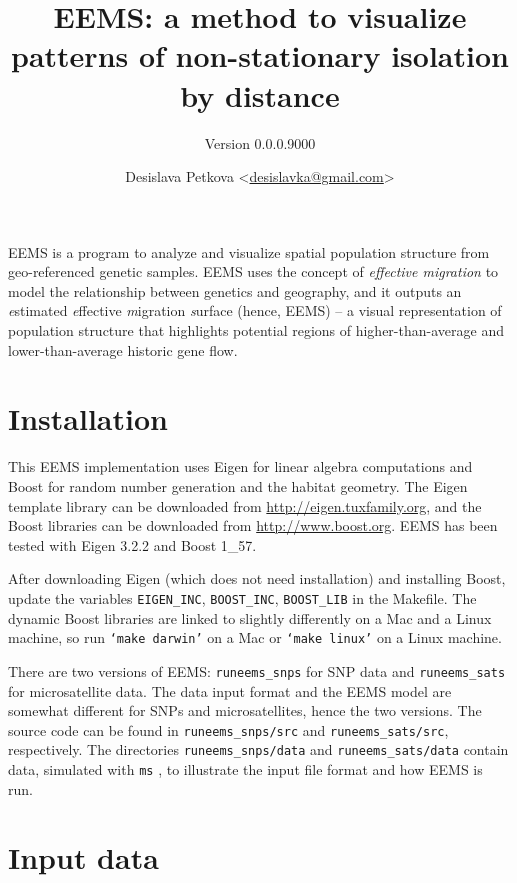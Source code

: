 \documentclass[a4paper,10pt,DIV=15,titlepage,mpinclude=true]{scrartcl}
\title{EEMS: a method to visualize patterns of non-stationary isolation by distance}
\subtitle{Version 0.0.0.9000}
\author{Desislava Petkova <\href{mailto:desislavka@gmail.com}{desislavka@gmail.com}>}
\newcommand{\keystring}[1]{{\tt #1}}
\begin{document}
\maketitle
\tableofcontents
\listoffigures
\clearpage


EEMS is a program to analyze and visualize spatial population structure from geo-referenced genetic samples. EEMS uses the concept of \textit{effective migration} to model the relationship between genetics and geography, and it outputs an \textit{e}stimated \textit{e}ffective \textit{m}igration \textit{s}urface (hence, EEMS) -- a visual representation of population structure that highlights potential regions of higher-than-average and lower-than-average historic gene flow.

\section{Installation}

This EEMS implementation uses Eigen for linear algebra computations and Boost for random number generation and the habitat geometry. The Eigen template library can be downloaded from \url{http://eigen.tuxfamily.org}, and the Boost libraries can be downloaded from \url{http://www.boost.org}. EEMS has been tested with Eigen 3.2.2 and Boost 1\_57.

After downloading Eigen (which does not need installation) and installing Boost, update the variables {\tt EIGEN\_INC}, {\tt BOOST\_INC}, {\tt BOOST\_LIB} in the Makefile. The dynamic Boost libraries are linked to slightly differently on a Mac and a Linux machine, so run \keystring{`make darwin'} on a Mac or \keystring{`make linux'} on a Linux machine.

There are two versions of EEMS: \keystring{runeems\_snps} for SNP data and \keystring{runeems\_sats} for microsatellite data. The data input format and the EEMS model are somewhat different for SNPs and microsatellites, hence the two versions. The source code can be found in \keystring{runeems\_snps/src} and \keystring{runeems\_sats/src}, respectively. The directories \keystring{runeems\_snps/data} and \keystring{runeems\_sats/data} contain data, simulated with \keystring{ms} \cite{Hudson:2002fk}, to illustrate the input file format and how EEMS is run.

\section{Input data}
\end{document}
